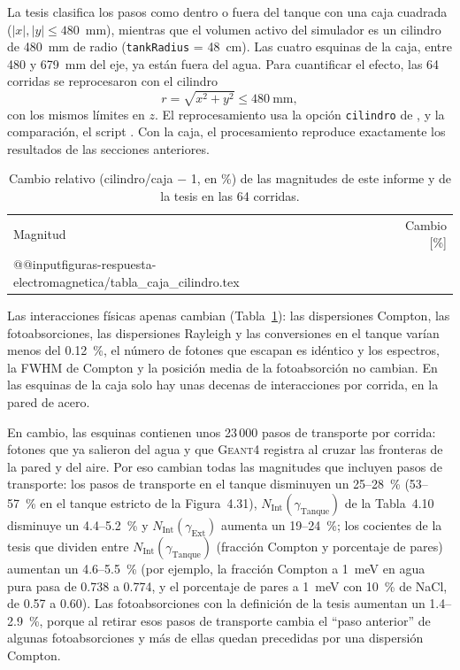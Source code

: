 \documentclass[11pt,a4paper]{article}
\newcommand{\tablas}{figuras-respuesta-electromagnetica}
\newcommand{\archivo}[1]{\texttt{\detokenize{#1}}}
\newcommand{\var}[1]{\texttt{#1}}
\begin{document}
La tesis clasifica los pasos como dentro o fuera del tanque con una caja cuadrada ($|x|,|y|\le480$~mm), mientras que el volumen activo del simulador es un cilindro de 480~mm de radio (\var{tankRadius} = 48~cm). Las cuatro esquinas de la caja, entre 480 y 679~mm del eje, ya están fuera del agua. Para cuantificar el efecto, las 64 corridas se reprocesaron con el cilindro
\[
r=\sqrt{x^2+y^2}\le480~\mathrm{mm},
\]
con los mismos límites en $z$. El reprocesamiento usa la opción \texttt{cilindro} de \archivo{procesar_gammas.py}, y la comparación, el script \archivo{comparar_cilindro_gammas.py}. Con la caja, el procesamiento reproduce exactamente los resultados de las secciones anteriores.

\begin{table}[H]
\centering\small
\caption{Cambio relativo (cilindro/caja $-$ 1, en \%) de las magnitudes de este informe y de la tesis en las 64 corridas.}
\label{tab:cilindro}
\begin{tabular}{@{}lr@{}}
\toprule
Magnitud & Cambio [\%] \\
\csname @@input\endcsname \tablas/tabla_caja_cilindro.tex
\bottomrule
\end{tabular}
\end{table}

Las interacciones físicas apenas cambian (Tabla~\ref{tab:cilindro}): las dispersiones Compton, las fotoabsorciones, las dispersiones Rayleigh y las conversiones en el tanque varían menos del 0.12~\%, el número de fotones que escapan es idéntico y los espectros, la FWHM de Compton y la posición media de la fotoabsorción no cambian. En las esquinas de la caja solo hay unas decenas de interacciones por corrida, en la pared de acero.

En cambio, las esquinas contienen unos 23\,000 pasos de transporte por corrida: fotones que ya salieron del agua y que \textsc{Geant4} registra al cruzar las fronteras de la pared y del aire. Por eso cambian todas las magnitudes que incluyen pasos de transporte: los pasos de transporte en el tanque disminuyen un 25--28~\% (53--57~\% en el tanque estricto de la Figura~4.31), $N_\mathrm{Int}(\gamma_\mathrm{Tanque})$ de la Tabla~4.10 disminuye un 4.4--5.2~\% y $N_\mathrm{Int}(\gamma_\mathrm{Ext})$ aumenta un 19--24~\%; los cocientes de la tesis que dividen entre $N_\mathrm{Int}(\gamma_\mathrm{Tanque})$ (fracción Compton y porcentaje de pares) aumentan un 4.6--5.5~\% (por ejemplo, la fracción Compton a 1~meV en agua pura pasa de 0.738 a 0.774, y el porcentaje de pares a 1~meV con 10~\% de NaCl, de 0.57 a 0.60). Las fotoabsorciones con la definición de la tesis aumentan un 1.4--2.9~\%, porque al retirar esos pasos de transporte cambia el ``paso anterior'' de algunas fotoabsorciones y más de ellas quedan precedidas por una dispersión Compton.
\end{document}
